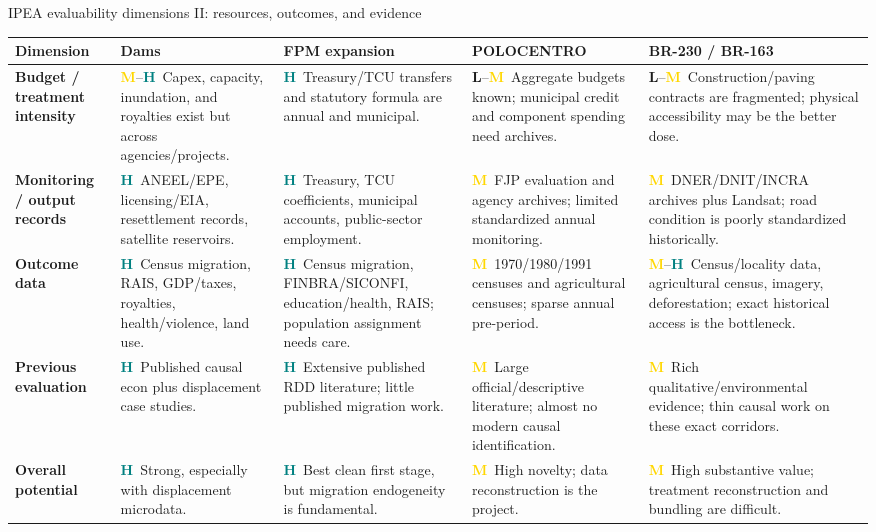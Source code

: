 \documentclass[aspectratio=169,10pt]{beamer}
\newcommand{\hi}{\textcolor{Teal}{\textbf{H}}}
\newcommand{\med}{\textcolor{Gold}{\textbf{M}}}
\newcommand{\low}{\textcolor{Brick}{\textbf{L}}}
\begin{document}
\begin{frame}{IPEA evaluability dimensions II: resources, outcomes, and evidence}
\scriptsize
\renewcommand{\arraystretch}{1.25}
\begin{tabularx}{\textwidth}{L{2.35cm}YYYY}
\toprule
\textbf{Dimension} & \textbf{Dams} & \textbf{FPM expansion} & \textbf{POLOCENTRO} & \textbf{BR-230 / BR-163} \\
\midrule
\textbf{Budget / treatment intensity} & \med--\hi\ Capex, capacity, inundation, and royalties exist but across agencies/projects. & \hi\ Treasury/TCU transfers and statutory formula are annual and municipal. & \low--\med\ Aggregate budgets known; municipal credit and component spending need archives. & \low--\med\ Construction/paving contracts are fragmented; physical accessibility may be the better dose. \\
\textbf{Monitoring / output records} & \hi\ ANEEL/EPE, licensing/EIA, resettlement records, satellite reservoirs. & \hi\ Treasury, TCU coefficients, municipal accounts, public-sector employment. & \med\ FJP evaluation and agency archives; limited standardized annual monitoring. & \med\ DNER/DNIT/INCRA archives plus Landsat; road condition is poorly standardized historically. \\
\textbf{Outcome data} & \hi\ Census migration, RAIS, GDP/taxes, royalties, health/violence, land use. & \hi\ Census migration, FINBRA/SICONFI, education/health, RAIS; population assignment needs care. & \med\ 1970/1980/1991 censuses and agricultural censuses; sparse annual pre-period. & \med--\hi\ Census/locality data, agricultural census, imagery, deforestation; exact historical access is the bottleneck. \\
\textbf{Previous evaluation} & \hi\ Published causal econ plus displacement case studies. & \hi\ Extensive published RDD literature; little published migration work. & \med\ Large official/descriptive literature; almost no modern causal identification. & \med\ Rich qualitative/environmental evidence; thin causal work on these exact corridors. \\
\textbf{Overall potential} & \hi\ Strong, especially with displacement microdata. & \hi\ Best clean first stage, but migration endogeneity is fundamental. & \med\ High novelty; data reconstruction is the project. & \med\ High substantive value; treatment reconstruction and bundling are difficult. \\
\bottomrule
\end{tabularx}
\end{frame}
\end{document}
